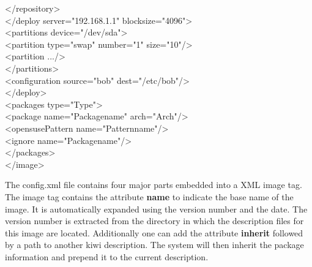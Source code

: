 \begin{itemize}
\begin{Command}{15cm}
      \hspace*{1cm}</repository>\\
      \hspace*{1cm}</deploy server="192.168.1.1" blocksize="4096">\\
      \hspace*{2cm}<partitions device="/dev/sda">\\
      \hspace*{3cm}<partition type="swap" number="1" size="10"/>\\
      \hspace*{3cm}<partition .../>\\
      \hspace*{2cm}</partitions>\\
      \hspace*{2cm}<configuration source="bob" dest="/etc/bob"/>\\
      \hspace*{1cm}</deploy>\\
      \hspace*{1cm}<packages type="Type">\\
      \hspace*{2cm}<package name="Packagename" arch="Arch"/>\\
      \hspace*{2cm}<opensusePattern name="Patternname"/>\\
      \hspace*{2cm}<ignore name="Packagename"/>\\
      \hspace*{1cm}</packages>\\
      </image>
	  \end{Command}

      The config.xml file contains four major parts embedded into a
      XML image tag. The image tag contains the attribute \textbf{name}
      to indicate the base name of the image. It is automatically expanded
      using the version number and the date. The version number is
      extracted from the directory in which the description files for
      this image are located. Additionally one can add the attribute
      \textbf{inherit} followed by a path to another kiwi description.
      The system will then inherit the package information and prepend
      it to the current description.


\end{itemize}
